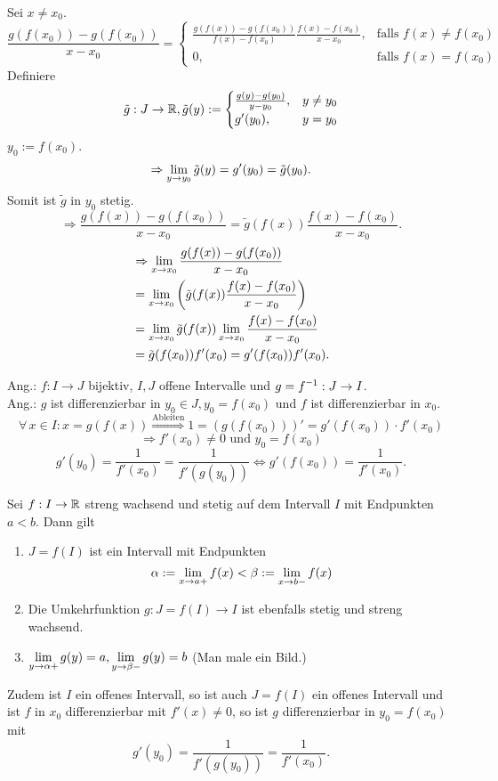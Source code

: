 \documentclass[../ana1.tex]{subfiles}
\begin{document}
\begin{bew}
    Sei \( x \neq x_0 \).
    \[ \frac{ g(f(x_0)) - g(f(x_0)) }{ x - x_0 } = \begin{cases}
        \frac{ g(f(x)) - g(f(x_0)) }{f(x) - f(x_0)} 
        \frac{ f(x) - f(x_0) }{ x-x_0 }, &\text{falls } f(x) \neq f(x_0)\\
        0, &\text{falls } f(x) = f(x_0)
    \end{cases} \]
    Definiere \[ \tilde{g} : J \rightarrow \mathbb{R}, \tilde{g}(y) := \begin{cases}
        \frac{ g(y) - g(y_0) }{ y - y_0 }, &y \neq y_0\\
        g'(y_0), &y=y_0
    \end{cases} \]
    \( y_0 := f(x_0) \).
    \[ \Rightarrow \lim\limits_{y\rightarrow y_0} \tilde{g}(y) = g'(y_0) = \tilde{g}(y_0). \]
    Somit ist \( \tilde{g} \) in \(y_0\) stetig.
    \[ \Rightarrow \frac{ g(f(x)) - g(f(x_0)) }{ x - x_0 } 
    = \tilde{g}(f(x)) \frac{ f(x) - f(x_0) }{x - x_0}. \]
    \begin{align*}
        &\Rightarrow \lim\limits_{x\rightarrow x_0} \frac{ g(f(x)) - g(f(x_0)) }{ x - x_0 } \\
        &= \lim\limits_{x\rightarrow x_0} \left( \tilde{g}(f(x)) \frac{f(x) - f(x_0)}{x - x_0} \right) \\
        &= \lim\limits_{x\rightarrow x_0} \tilde{g}(f(x)) \lim\limits_{x\rightarrow x_0} \frac{f(x) - f(x_0)}{x - x_0} \\
        &= \tilde{g}(f(x_0))f'(x_0) = g'(f(x_0)) f'(x_0).
    \end{align*}
\end{bew}
Ang.: \( f : I \rightarrow J\) bijektiv, \( I, J \) offene Intervalle und 
\( g = \inverse{f} : J \rightarrow I \).\\
Ang.: \( g \) ist differenzierbar in \( y_0 \in J, y_0 = f(x_0) \) und 
\( f \) ist differenzierbar in \(x_0\).
\[\forall \, x\in I: x = g(f(x)) \overset{\text{Ableiten}}{\Rightarrow} 1 = (g(f(x_0)))' 
= g'(f(x_0)) \cdot f'(x_0) \]
\[ \Rightarrow f'(x_0) \neq 0 \text{ und } y_0 = f(x_0) \]
\[ g'(y_0) = \frac{1}{f'(x_0)} = \frac{1}{f'(g(y_0))} 
\Leftrightarrow g'(f(x_0)) = \frac{1}{f'(x_0)}. \]
\begin{satz}\label{satz:diffbar_umkehr}
    Sei \( f: I \rightarrow \mathbb{R} \) streng wachsend und stetig auf 
    dem Intervall \(I\) mit Endpunkten \( a < b \). Dann gilt 
    \begin{enumerate}
        \item \( J = f(I) \) ist ein Intervall mit Endpunkten 
        \[ \alpha := \lim\limits_{x\rightarrow a +} f(x) 
        < \beta := \lim\limits_{x\rightarrow b -} f(x) \]
        \item Die Umkehrfunktion \( g: J = f(I) \rightarrow I \) ist 
        ebenfalls stetig und streng wachsend.
        \item \( \lim\limits_{y\rightarrow \alpha +} g(y) = a, 
        \lim\limits_{y\rightarrow \beta -} g(y) = b \) (Man male ein Bild.)
    \end{enumerate}
    Zudem ist \( I \) ein offenes Intervall, so ist auch \( J = f(I) \) 
    ein offenes Intervall und ist \(f\) in \(x_0\) differenzierbar mit 
    \( f'(x) \neq 0 \), so ist \(g\) differenzierbar in \( y_0 = f(x_0) \) 
    mit 
    \[ g'(y_0) = \frac{1}{f'(g(y_0))} = \frac{1}{f'(x_0)}. \]
\end{satz}
\end{document}
